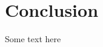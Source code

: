 \clearpage{\pagestyle{empty}\cleardoublepage}
\chapter*{Conclusion}

\begin{doublespace}
Some text here
\end{doublespace}

\clearpage{\pagestyle{empty}\cleardoublepage}
